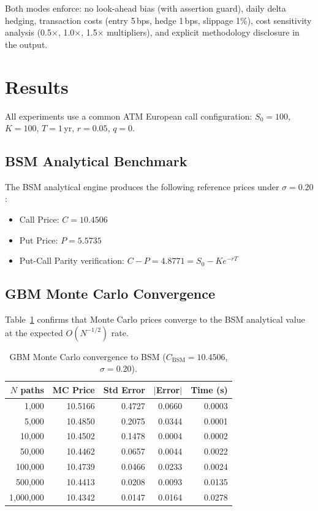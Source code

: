 \documentclass[12pt,a4paper]{article}
\begin{document}
Both modes enforce: no look-ahead bias (with assertion guard), daily delta hedging, transaction costs (entry 5\,bps, hedge 1\,bps, slippage 1\%), cost sensitivity analysis (0.5$\times$, 1.0$\times$, 1.5$\times$ multipliers), and explicit methodology disclosure in the output.

\section{Results}

All experiments use a common ATM European call configuration: $S_0 = 100$, $K = 100$, $T = 1$\,yr, $r = 0.05$, $q = 0$.

\subsection{BSM Analytical Benchmark}

The BSM analytical engine produces the following reference prices under $\sigma = 0.20$:
\begin{itemize}
\item Call Price: $C = 10.4506$
\item Put Price: $P = 5.5735$
\item Put-Call Parity verification: $C - P = 4.8771 = S_0 - Ke^{-rT}$ \checkmark
\end{itemize}

\subsection{GBM Monte Carlo Convergence}

Table~\ref{tab:convergence} confirms that Monte Carlo prices converge to the BSM analytical value at the expected $O(N^{-1/2})$ rate.

\begin{table}[H]
\centering
\caption{GBM Monte Carlo convergence to BSM ($C_{\text{BSM}} = 10.4506$, $\sigma = 0.20$).}
\label{tab:convergence}
\begin{tabular}{@{}rrrrr@{}}
\toprule
$N$ paths & MC Price & Std Error & $|$Error$|$ & Time (s) \\
\midrule
1{,}000      & 10.5166 & 0.4727 & 0.0660 & 0.0003 \\
5{,}000      & 10.4850 & 0.2075 & 0.0344 & 0.0001 \\
10{,}000     & 10.4502 & 0.1478 & 0.0004 & 0.0002 \\
50{,}000     & 10.4462 & 0.0657 & 0.0044 & 0.0022 \\
100{,}000    & 10.4739 & 0.0466 & 0.0233 & 0.0024 \\
500{,}000    & 10.4413 & 0.0208 & 0.0093 & 0.0135 \\
1{,}000{,}000 & 10.4342 & 0.0147 & 0.0164 & 0.0278 \\
\bottomrule
\end{tabular}
\end{table}
\end{document}
